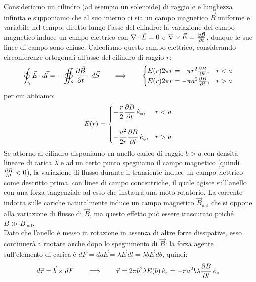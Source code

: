 Consideriamo un cilindro (ad esempio un solenoide) di raggio $ a $ e lunghezza infinita e supponiamo che al suo interno ci sia un campo magnetico $ \vec{B} $ uniforme e variabile nel tempo, diretto lungo l'asse del cilindro: la variazione del campo magnetico induce un campo elettrico con $ \nabla\cdot\vec{E} = 0 $ e $ \nabla\times\vec{E} = \frac{\partial\vec{B}}{\partial t} $, dunque le sue linee di campo sono chiuse. Calcoliamo questo campo elettrico, considerando circonferenze ortogonali all'asse del cilindro di raggio $ r $:
\begin{equation}
	\oint_{\gamma} \vec{E}\cdot d\vec{l} = - \oiint_{S} \frac{\partial\vec{B}}{\partial t}\cdot d\vec{S} \qquad\Longrightarrow\qquad
	\begin{cases}
		E(r) 2\pi r = - \pi r^2 \frac{\partial B}{\partial t} , & r < a \\
		
		E(r) 2\pi r = - \pi a^2 \frac{\partial B}{\partial t} , & r > a
	\end{cases}
	\label{eq:35}
\end{equation}
per cui abbiamo:
\begin{equation}
	\vec{E}(r) = 
	\begin{cases}
		-\displaystyle\frac{r}{2} \displaystyle\frac{\partial B}{\partial t} \,\hat{e}_{\phi} , & r < a \\
		\\ 
		-\displaystyle\frac{a^2}{2r} \displaystyle\frac{\partial B}{\partial t} \,\hat{e}_{\phi} , & r > a
	\end{cases}
	\label{eq:36}
\end{equation}
%
Se attorno al cilindro disponiamo un anello carico di raggio $ b > a $ con densità lineare di carica $ \lambda $ e ad un certo punto spegniamo il campo magnetico (quindi $ \frac{\partial B}{\partial t} < 0 $), la variazione di flusso durante il transiente induce un campo elettrico come descritto prima, con linee di campo concentriche, il quale agisce sull'anello con una forza tangenziale ad esso che instaura una moto rotatorio. La corrente indotta sulle cariche naturalmente induce un campo magnetico $ \vec{B}_{\text{ind}} $ che si oppone alla variazione di flusso di $ \vec{B} $, ma questo effetto può essere trascurato poiché $ B \gg B_{\text{ind}} $. \\ 
Dato che l'anello è messo in rotazione in assenza di altre forze dissipative, esso continuerà a ruotare anche dopo lo spegnimento di $ \vec{B} $: la forza agente sull'elemento di carica è $ d\vec{F} = dq\vec{E} = \lambda \vec{E}\,dl = \lambda b \vec{E} \,d\theta $, quindi:
\begin{equation}
	d\vec{\tau} = \vec{b}\times d\vec{F} \qquad\Longrightarrow\qquad \vec{\tau} = 2\pi b^2 \lambda E(b) \,\hat{e}_z = -\pi a^2 b \lambda \frac{\partial B}{\partial t} \,\hat{e}_z
	\label{eq:37}
\end{equation}
